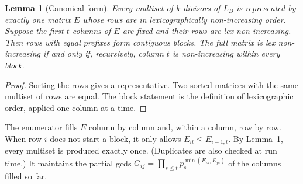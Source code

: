 \documentclass[11pt]{article}
\newtheorem{lemma}[theorem]{Lemma}
\theoremstyle{definition}
\theoremstyle{remark}
\begin{document}
\begin{lemma}[Canonical form]\label{lem:canon}
Every multiset of $k$ divisors of $L_B$ is represented by exactly one matrix $E$ whose rows are in
lexicographically non-increasing order. Suppose the first $t$ columns of $E$ are fixed and
their rows are lex non-increasing. Then rows with equal prefixes form contiguous blocks. The
full matrix is lex non-increasing if and only if, recursively, column $t$ is non-increasing
within every block.
\end{lemma}
\begin{proof}
Sorting the rows gives a representative. Two sorted matrices with the same multiset of rows are
equal. The block statement is the definition of lexicographic order, applied one column at a
time.
\end{proof}

The enumerator fills $E$ column by column and, within a column, row by row. When row $i$ does
not start a block, it only allows $E_{it}\le E_{i-1,t}$. By Lemma~\ref{lem:canon}, every multiset
is produced exactly once. (Duplicates are also checked at run time.) It maintains the partial
gcds $G_{ij}=\prod_{s\le t}p_s^{\min(E_{is},E_{js})}$ of the columns filled so far.
\end{document}
